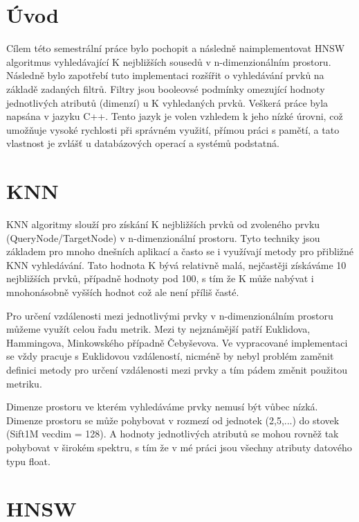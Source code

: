 \documentclass[czech,semestral,dept460,male,csharp,cpdeclaration]{diploma}
\begin{document}
	
	\MakeTitlePages
	
	\chapter{Úvod}
	
		Cílem této semestrální práce bylo pochopit a následně naimplementovat HNSW algoritmus vyhledávající K nejbližších sousedů v n-dimenzionálním prostoru. Následně bylo zapotřebí tuto implementaci rozšířit o vyhledávání prvků na základě zadaných filtrů. Filtry jsou booleovsé podmínky omezující hodnoty jednotlivých atributů (dimenzí) u K vyhledaných prvků. Veškerá práce byla napsána v jazyku C++. Tento jazyk je volen vzhledem k jeho nízké úrovni, což umožňuje vysoké rychlosti při správném využití, přímou práci s pamětí, a tato vlastnost je zvlášť u databázových operací a systémů podstatná.
	
	\chapter{KNN}
	
		KNN algoritmy slouží pro získání K nejbližších prvků od zvoleného prvku (QueryNode/TargetNode) v n-dimenzionální prostoru. Tyto techniky jsou základem pro mnoho dnešních aplikací a často se i využívají metody pro přibližné KNN vyhledávání. Tato hodnota K bývá relativně malá, nejčastěji získáváme 10 nejbližších prvků, případně hodnoty pod 100, s tím že K může nabývat i mnohonásobně vyšších hodnot což ale není příliš časté.
		
		Pro určení vzdálenosti mezi jednotlivými prvky v n-dimenzionálním prostoru můžeme využít celou řadu metrik. Mezi ty nejznámější patří Euklidova, Hammingova, Minkowského případně Čebyševova. Ve vypracované implementaci se vždy pracuje s Euklidovou vzdáleností, nicméně by nebyl problém zaměnit definici metody pro určení vzdálenosti mezi prvky a tím pádem změnit použitou metriku.
		
		Dimenze prostoru ve kterém vyhledáváme prvky nemusí být vůbec nízká. Dimenze prostoru se může pohybovat v rozmezí od jednotek (2,5,...) do stovek (Sift1M vecdim = 128). A hodnoty jednotlivých atributů se mohou rovněž tak pohybovat v širokém spektru, s tím že v mé práci jsou všechny atributy datového typu float.
	
	\chapter{HNSW}
	
\end{document}
